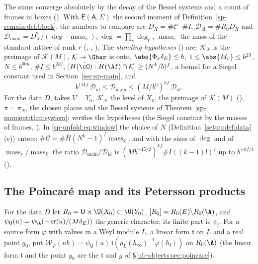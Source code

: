 The sums converge absolutely by the decay of the Bessel systems and a count of frames in boxes
(). With $\mathsf E(\mathsf A,\Sigma)$ the second moment of
Definition~\ref{sp-remain:def:block}, the numbers to compare are $D_X=\#\mathcal C\cdot\#I$,
$\mathcal D_{\mathrm{id}}=\#\bar R_0D_X$ and $\mathcal D_{\mathrm{main}}=D_X^2/(\deg\cdot
\operatorname{mass}_r)$, $\deg=\prod_v\deg_v$, $\operatorname{mass}_r$ the mass of the standard
lattice of rank $r$ (, ,
). The \emph{standing hypotheses}
() are: $\mathcal K_X$ is the preimage of $\mathcal K(M)$, $\mathcal K\to\Gbar$ is onto,
$\abs{\Phi_v\delta_E}\le b$, $1\le\abs{M_v}\le b^{23}$, $N\le b^{60n}$, $\#I\le b^{2kf}$,
$[H(\hat\cO):H(\Af)\cap\mathcal K]\ge(N^k/b)^f$, a bound for a Siegel constant used in
Section~\ref{sec:sp-main}, and
\begin{equation}\label{sp-unfold:eq:window}
b^{11kf}\,\mathcal D_{\mathrm{id}}\le\mathcal D_{\mathrm{main}}\le(M/b^6)^{kf}\,\mathcal D_{\mathrm{id}}.
\end{equation}
For the data $D$,  takes $V=Y_0$, $\mathcal K_X$ the level of $X_0$, the
preimage of $\mathcal K(M)$ (), $\pi=\pi_N$, the chosen places and the Bessel systems of
Theorem~\ref{sp-moment:thm:system}; 
verifies the hypotheses (the Siegel constant by the masses of frames, ). In \eqref{sp-unfold:eq:window} the choice of $N$ (Definition~\ref{setup:def:data}(e))
enters: $\#\mathcal C=\#\bar H(N^k-1)^f\operatorname{mass}_k$, and with the sizes of $\deg$ and of
$\operatorname{mass}_r/\operatorname{mass}_k$ the ratio $\mathcal D_{\mathrm{main}}/\mathcal
D_{\mathrm{id}}$ is $(Mb^{-15/2})^{kf}\#I((k-1)!)^f$ up to $b^{\pm kf/4}$
().

\subsection{The Poincaré map and its Petersson products}\label{sp-unfold:ss:poincare}

For the data $D$ let $R_0=\mathsf U\rtimes\U(X_0)\subset\U(Y_0)$, $[R_0]=R_0(E)\backslash R_0(\A)$,
and $\psi_{\mathsf U}(u)=\psi_\A(-\operatorname{sr}(u)/(M\delta_E))$ the generic character; its finite part is $\psi_{\mathrm f}$. For a
source form $\varphi$ with values in a Weyl module $L$, a linear form $\mathfrak t$ on $L$ and a real point
$g_0$, put $\mathcal W_\varphi(uh)=\psi_{\mathsf U}(u)\,\mathfrak t(\rho_L(h_\infty)^{-1}\varphi(h_{\mathrm f}))$ on $R_0(\A)$
(the linear form $\mathfrak t$ and the point $g_0$ are the $\mathfrak t$ and $g$ of
\S\ref{ub-objects:sec:poincare}).

